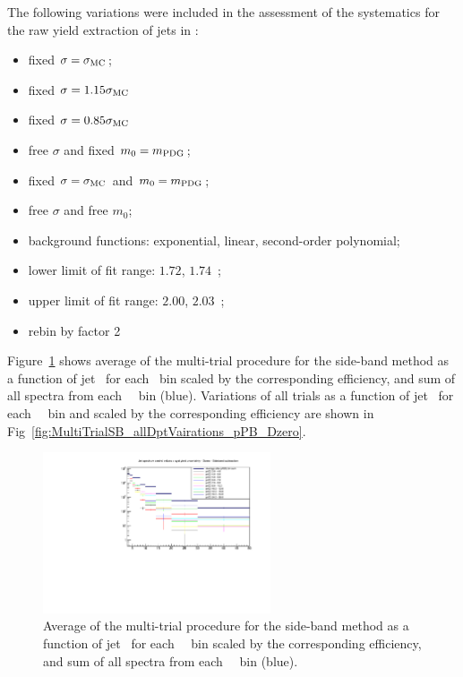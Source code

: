 The following variations were included in the assessment of the systematics for the raw yield extraction of \Dzero jets in \pp:
\begin{itemize}
\item fixed $\sigma=\sigma_{\rm MC}$;
\item fixed $\sigma=1.15\sigma_{\rm MC}$
\item fixed $\sigma=0.85\sigma_{\rm MC}$
\item free $\sigma$ and fixed $m_{0}=m_{\rm PDG}$;
\item fixed $\sigma=\sigma_{\rm MC}$ and $m_{0}=m_{\rm PDG}$;
\item free $\sigma$ and free $m_{0}$;
\item background functions: exponential, linear, second-order polynomial;
\item lower limit of fit range: $1.72$, $1.74$~\GeVcsq;
\item upper limit of fit range: $2.00$, $2.03$~\GeVcsq;
\item rebin by factor 2
\end{itemize}

Figure~\ref{fig:MultiTrialSB_trials_pPB_Dzero} shows average of the multi-trial procedure for the side-band method as a function of jet \pt\ for each \Dzero \pt\ bin scaled by the corresponding efficiency, and sum of all spectra from each \Dzero\ \pt\ bin (blue). 
Variations of all trials as a function of jet \pt\ for each \Dzero\ \pt\ bin and scaled by the corresponding efficiency are shown in Fig~\ref{fig:MultiTrialSB_allDptVairations_pPB_Dzero}.

\begin{figure}[bth]
\begin{center}
\includegraphics[width=0.6\textwidth]{pPbcuts_2sig/multi_trial/cDistrAllAvgs.pdf}
\caption{Average of the multi-trial procedure for the side-band method as a function of jet \pt\ for each \Dzero\ \pt\ bin scaled by the corresponding efficiency, and sum of all spectra from each \Dzero\ \pt\ bin (blue).} 
\label{fig:MultiTrialSB_trials_pPB_Dzero}
\end{center}
\end{figure}

